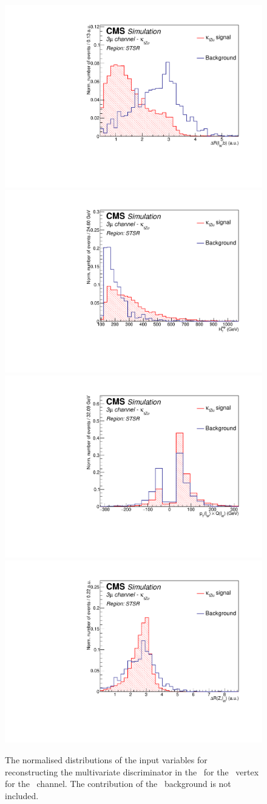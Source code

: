\begin{figure}[htbp]
	\includegraphics[width=0.3\linewidth]{6_Search/Figures/PlotsTechnics/dRWlepbZutsingletopuuu_norm}
	\includegraphics[width=0.3\linewidth]{6_Search/Figures/PlotsTechnics/TotalHt_lepZutsingletopuuu_norm}
	\includegraphics[width=0.3\linewidth]{6_Search/Figures/PlotsTechnics/ptWQZutsingletopuuu_norm}
	\includegraphics[width=0.3\linewidth]{6_Search/Figures/PlotsTechnics/dRZWlepZutsingletopuuu_norm}
	\caption{The normalised distributions of the input variables for reconstructing the multivariate discriminator in the \STSR\ for the \Zut\ vertex for the \mumumu\ channel. The contribution of the \NPL\ background is not included. }
	\label{fig:singletopZutnormalizeduuu}
\end{figure}

